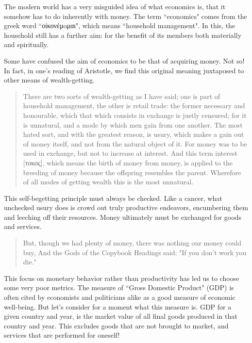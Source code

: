 \documentclass[letterpaper]{article}
\begin{document}
The modern world has a very misguided idea of what economics is, that it somehow has to do inherently with money. The term ``economics" comes from the greek word ``οίκονέμoμαι", which means ``household management". In this, the household still has a further aim: for the benefit of its members both materially and spiritually.

Some have confused the aim of economics to be that of acquiring money. Not so! In fact, in one's reading of Aristotle, we find this original meaning juxtaposed to other means of wealth-getting.

\begin{quote}
  There are two sorts of wealth-getting as I have said; one is part of household management, the other is retail trade: the former necessary and honourable, which that which consists in exchange is justly censured; for it is unnatural, and a mode by which men gain from one another. The most hated sort, and with the greatest reason, is usury, which makes a gain out of money itself, and not from the natural object of it. For money was to be used in exchange, but not to increase at interest. And this term interest [τοκος], which means the birth of money from money, is applied to the breeding of money because the offspring resembles the parent. Wherefore of all modes of getting wealth this is the most unnatural.
\end{quote}

This self-begetting principle must always be checked. Like a cancer, what unchecked usury does is crowd out truly productive endeavors, encumbering them and leeching off their resources. Money ultimately must be exchanged for goods and services.

\begin{quote}
  But, though we had plenty of money, there was nothing our money could buy,
  And the Gods of the Copybook Headings said: "If you don't work you die."
\end{quote}

This focus on monetary behavior rather than productivity has led us to choose some very poor metrics. The measure of ``Gross Domestic Product" (GDP) is often cited by economists and politicians alike as a good measure of economic well-being. But let's consider for a moment what this measure is. GDP for a given country and year, is the market value of all final goods produced in that country and year. This excludes goods that are not brought to market, and services that are performed for oneself!
\end{document}
